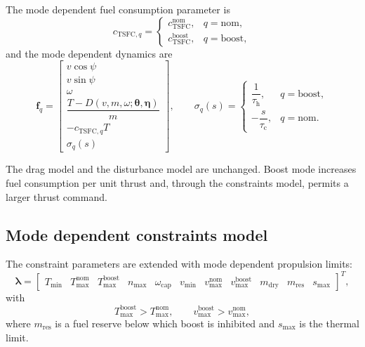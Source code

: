 \documentclass[11pt,a4paper]{article}
\newcommand{\vectheta}{\bm{\theta}}
\newcommand{\veceta}{\bm{\eta}}
\newcommand{\veclambda}{\bm{\lambda}}
\newcommand{\vecf}{\bm{f}}
\begin{document}
The mode dependent fuel consumption parameter is
\begin{equation}
  c_{\mathrm{TSFC},q} =
  \begin{cases}
    c^{\mathrm{nom}}_{\mathrm{TSFC}}, & q = \mathrm{nom}, \\
    c^{\mathrm{boost}}_{\mathrm{TSFC}}, & q = \mathrm{boost},
  \end{cases}
\end{equation}
and the mode dependent dynamics are
\begin{equation}
  \vecf_q =
  \begin{bmatrix}
    v\cos\psi \\[2pt]
    v\sin\psi \\[2pt]
    \omega \\[2pt]
    \dfrac{T - D(v, m, \omega; \vectheta, \veceta)}{m} \\[8pt]
    -c_{\mathrm{TSFC},q} T \\[4pt]
    \sigma_q(s)
  \end{bmatrix},
  \qquad
  \sigma_q(s) =
  \begin{cases}
    \dfrac{1}{\tau_{\mathrm{h}}}, & q = \mathrm{boost}, \\[8pt]
    -\dfrac{s}{\tau_{\mathrm{c}}}, & q = \mathrm{nom} .
  \end{cases}
  \label{eq:f-mode}
\end{equation}

The drag model and the disturbance model are unchanged. Boost mode increases
fuel consumption per unit thrust and, through the constraints model, permits a
larger thrust command.

\subsection{Mode dependent constraints model}

The constraint parameters are extended with mode dependent propulsion limits:
\begin{equation}
  \veclambda = \begin{bmatrix}
    T_{\min} & T^{\mathrm{nom}}_{\max} & T^{\mathrm{boost}}_{\max} &
    n_{\max} & \omega_{\mathrm{cap}} &
    v_{\min} & v^{\mathrm{nom}}_{\max} & v^{\mathrm{boost}}_{\max} &
    m_{\mathrm{dry}} & m_{\mathrm{res}} & s_{\max}
  \end{bmatrix}^{T},
\end{equation}
with
\begin{equation}
  T^{\mathrm{boost}}_{\max} > T^{\mathrm{nom}}_{\max},
  \qquad
  v^{\mathrm{boost}}_{\max} > v^{\mathrm{nom}}_{\max},
\end{equation}
where $m_{\mathrm{res}}$ is a fuel reserve below which boost is inhibited and
$s_{\max}$ is the thermal limit.
\end{document}
